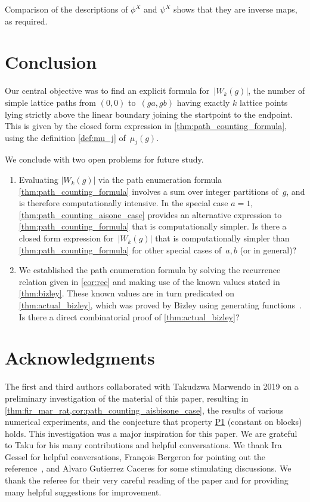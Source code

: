 \documentclass[11pt]{article}
\theoremstyle{definition} %
\numberwithin{equation}{section}
\begin{document}
Comparison of the descriptions of $\phi^X$ and $\psi^X$ shows that they are inverse maps, as required.


\section{Conclusion}
Our central objective was to find an explicit formula for~$|W_k(g)|$, the 
number of simple lattice paths from $(0,0)$ to~$(ga,gb)$ having exactly $k$ lattice points lying strictly above the linear boundary joining the startpoint to the endpoint. This is given by the closed form expression in \cref{thm:path_counting_formula}, using the definition \eqref{def:mu_j} of~$\mu_j(g)$.

We conclude with two open problems for future study.

\begin{enumerate}
    \item 
    Evaluating $|W_k(g)|$ via the path enumeration formula \cref{thm:path_counting_formula} involves a sum over integer partitions of~$g$, and is therefore computationally intensive.  In the special case $a=1$, \cref{thm:path_counting_aisone_case} provides an alternative expression to \cref{thm:path_counting_formula} that is computationally simpler. Is there a closed form expression for~$|W_k(g)|$ that is computationally simpler than \cref{thm:path_counting_formula} for other special cases of~$a,b$ (or in general)?
    
    \item We established the path enumeration formula by solving the recurrence relation given in \cref{cor:rec} and making use of the known values stated in \cref{thm:bizley}. These known values are in turn predicated on \cref{thm:actual_bizley}, which was proved by Bizley using generating functions~\cite{biz}. 
    Is there a direct combinatorial proof of \cref{thm:actual_bizley}?
\end{enumerate}


\section{Acknowledgments}
The first and third authors collaborated with Takudzwa Marwendo in 2019 on a preliminary investigation of the material of this paper, resulting in \cref{thm:fir_mar_rat,cor:path_counting_aisbisone_case}, the results of various numerical experiments, and the conjecture that 
property \hyperref[property:const_blocks]{P1} (constant on blocks) 
holds. This investigation was a major inspiration for this paper. We are grateful to Taku for his many contributions and helpful conversations. We thank Ira Gessel for helpful conversations, Fran\c{c}ois Bergeron for pointing out the reference~\cite{triangular-berg}, and Alvaro Gutierrez Caceres for some stimulating discussions.
We thank the referee for their very careful reading of the paper and for providing many helpful suggestions for improvement.
\end{document}
